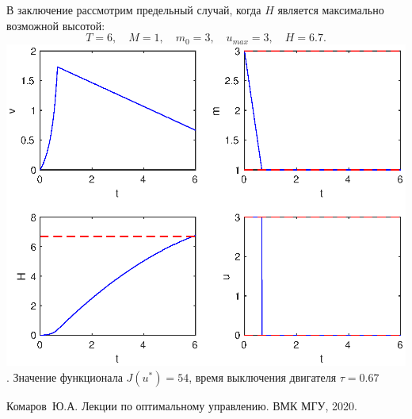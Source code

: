 \documentclass[16pt]{article}
\begin{document}
\newpage
В заключение рассмотрим предельный случай, когда $H$ является максимально возможной высотой:
$$T = 6, \quad M = 1, \quad m_0 = 3, \quad u_{max} = 3, \quad H = 6.7.$$
\includegraphics[width=160mm]{13.eps}. Значение функционала $J(u^*) = 54$, время выключения двигателя
$\tau = 0.67$

\newpage
\begin{thebibliography}{0}
	Комаров~Ю.А. Лекции по оптимальному управлению. ВМК МГУ, 2020. 
\end{thebibliography}
\end{document}
